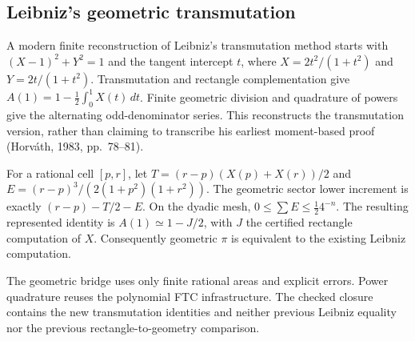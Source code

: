 \subsection{Leibniz's geometric transmutation}

A modern finite reconstruction of Leibniz's transmutation method starts with
$(X-1)^2+Y^2=1$ and the tangent intercept $t$, where
$X=2t^2/(1+t^2)$ and $Y=2t/(1+t^2)$. Transmutation and rectangle complementation
give $A(1)=1-\tfrac12\int_0^1X(t)\,dt$. Finite geometric division and quadrature
of powers give the alternating odd-denominator series. This reconstructs the
transmutation version, rather than claiming to transcribe his earliest
moment-based proof (Horváth, 1983, pp.~78--81).

\begin{theorem}
\leanok
For a rational cell $[p,r]$, let
$T=(r-p)(X(p)+X(r))/2$ and
$E=(r-p)^3/(2(1+p^2)(1+r^2))$.
The geometric sector lower increment is exactly $(r-p)-T/2-E$.
On the dyadic mesh, $0\leq\sum E\leq\tfrac12 4^{-n}$.
The resulting represented identity is $A(1)\simeq1-J/2$, with $J$ the
certified rectangle computation of $X$. Consequently geometric $\pi$ is
equivalent to the existing Leibniz computation.
\end{theorem}

The geometric bridge uses only finite rational areas and explicit errors.
Power quadrature reuses the polynomial FTC infrastructure. The checked
closure contains the new transmutation identities and neither previous
Leibniz equality nor the previous rectangle-to-geometry comparison.
